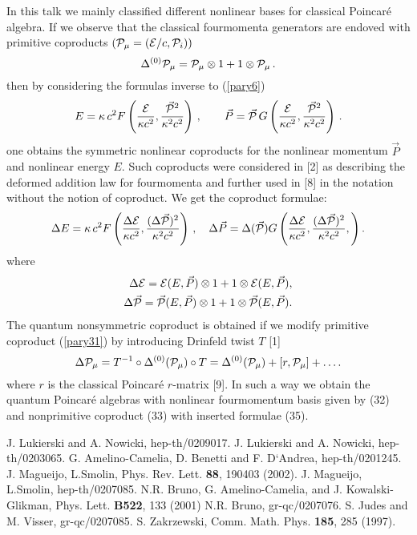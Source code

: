 \documentclass[a4paper,12pt]{article} \usepackage{times}
\begin{document}
In this talk we mainly classified   different  nonlinear
bases for classical Poincar\'{e} algebra. If we observe that the
classical fourmomenta generators are endoved with primitive
coproducts $({\cal P}_\mu = ({\cal E}/c, {\cal P}_{i}))$
\begin{equation}\label{pary31}
  \Delta^{(0)}  {\cal P}_{\mu} = {\cal P}_\mu \otimes 1 + 1 \otimes
  {\cal P}_\mu\, .
\end{equation}
then by considering the formulas inverse to (\ref{pary6})
\begin{equation}\label{pary32}
E = \kappa \, c^2 F\left(\frac{\cal E}{\kappa c^2},
\frac{\vec{\cal P}^2}{\kappa^2
  c^2}\right)\, ,
  \qquad
  \vec{P} = \vec{\cal P} \, G \left(
  \frac{\cal E}{\kappa c^2}, \frac{\vec{\cal P}^2}{\kappa^2
  c^2}\right)\, .
\end{equation}
one obtains the symmetric nonlinear coproducts for the nonlinear
momentum $\vec{P}$ and nonlinear energy $E$.
 Such coproducts were considered in [2] as  describing the 
deformed
  addition law for fourmomenta
 and
further used in [8]  in the notation without the notion of coproduct.
 We get  the coproduct formulae:
\begin{equation}\label{pary33}
  \Delta { E} = \kappa \,  c^2 F \left(
  \frac{\Delta{\cal E}}{\kappa c^2},
  \frac{(\Delta \vec{\cal P})^2}{\kappa^2  c^2}\right)\, ,\quad
  \Delta \vec{P} = \Delta (\vec{\cal P}) G
  \left(
  \frac{\Delta {\cal E}}{\kappa c^2},
  \frac{(\Delta \vec{\cal P})^2}{\kappa^2 c^2},
  \right) .
\end{equation}
where
\begin{eqnarray}\label{pary34}
\Delta {\cal E}   = {\cal E} (E , \vec{P}) \otimes 1 + 1 \otimes
{\cal E} (E, \vec{P}) ,\cr \Delta \vec{\cal P} = \vec{\cal P} (E,
\vec{P})\otimes 1 + 1 \otimes \vec{\cal P}(E,\vec{P}) .
\end{eqnarray}
The quantum nonsymmetric
  coproduct is obtained if we modify primitive coproduct
(\ref{pary31}) by introducing Drinfeld twist $T$ [1]
\begin{equation}\label{pary35}
\Delta {\cal P}_{\mu} = T^{-1} \circ \Delta^{(0)} ({\cal P}_\mu)
\circ T = \Delta^{(0)} ({\cal P}_\mu) + [ r, {\cal P}_\mu] +
\ldots .
\end{equation}
where $r$ is the classical Poincar\'{e} $r$-matrix [9]. In such a
way we obtain the quantum Poincar\'{e} algebras with nonlinear
fourmomentum basis  given by (32) and nonprimitive coproduct (33)
 with inserted formulae (35).



\begin{thebibliography}{10}
 J. Lukierski and A. Nowicki, hep-th/0209017.
 J. Lukierski and A. Nowicki, hep-th/0203065.
 G. Amelino-Camelia, D. Benetti and F. D`Andrea,
 hep-th/0201245.
 J. Magueijo, L.Smolin, Phys. Rev. Lett. {\bf 88}, 
190403
(2002).  J. Magueijo, L.Smolin, hep-th/0207085.
 N.R. Bruno, G. Amelino-Camelia, and J. Kowalski-Glikman,
 Phys. Lett. {\bf B522}, 133 (2001)
 N.R.  Bruno, gr-qc/0207076.
 S. Judes and M. Visser, gr-qc/0207085.
 S. Zakrzewski, Comm. Math. Phys. {\bf 185}, 285 
(1997).
\end{thebibliography} 
\end{document}
